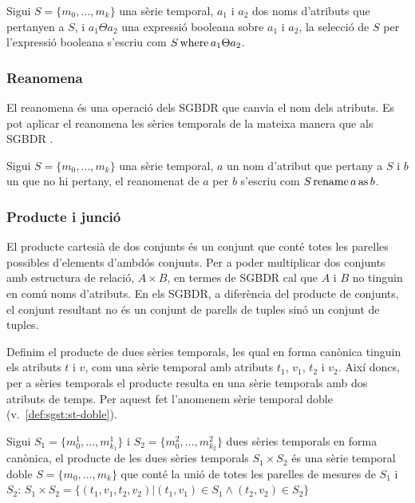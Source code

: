 Sigui $S =\{m_0, \dotsc, m_k\}$ una sèrie temporal, $a_1$ i $a_2$ dos
noms d'atributs que pertanyen a $S$, i $a_1 \Theta a_2$ una expressió
booleana sobre $a_1$ i $a_2$, la selecció de $S$ per l'expressió
booleana s'escriu com $S \operatorname*{where} a_1 \Theta a_2$.


\subsubsection{Reanomena}

El reanomena és una operació dels SGBDR que canvia el nom dels
atributs. Es pot aplicar el reanomena les sèries temporals de la
mateixa manera que als SGBDR \parencite{date:introduction}.

Sigui $S =\{m_0, \dotsc, m_k\}$ una sèrie temporal, $a$ un nom
d'atribut que pertany a $S$ i $b$ un que no hi pertany, el reanomenat
de $a$ per $b$ s'escriu com $S \operatorname*{rename} a \operatorname*{as} b$.





\subsubsection{Producte i junció}

El producte cartesià de dos conjunts és un conjunt que conté totes les
parelles possibles d'elements d'ambdós conjunts.  Per a poder
multiplicar dos conjunts amb estructura de relació, $A \times B$, en
termes de SGBDR cal que $A$ i $B$ no tinguin en comú noms d'atributs.
En els SGBDR, a diferència del producte de conjunts, el conjunt
resultant no és un conjunt de parells de tuples sinó un conjunt de
tuples.

\todo{} Definim el producte de dues sèries temporals, les qual en
forma canònica tinguin els atributs $t$ i $v$, com una sèrie temporal
amb atributs $t_1$, $v_1$, $t_2$ i $v_2$. Així doncs, per a sèries
temporals el producte resulta en una sèrie temporals amb dos atributs
de temps. Per aquest fet l'anomenem sèrie temporal doble
(v.\ \autoref{def:sgst:st-doble}).
\begin{definition}[producte]
  Sigui $S_1=\{m_0^1, \dotsc, m_{k_1}^1\}$ i $S_2=\{m_0^2, \dotsc,
  m_{k_2}^2\}$ dues sèries temporals en forma canònica, el producte de
  les dues sèries temporals $S_1 \times S_2$ és una sèrie temporal
  doble $S=\{m_0, \dotsc, m_k\}$ que conté la unió de totes les
  parelles de mesures de $S_1$ i $S_2$: $S_1 \times S_2 = \{
  (t_1,v_1,t_2,v_2) | (t_1,v_1) \in S_1 \wedge (t_2,v_2) \in S_2 \}$
\end{definition}

